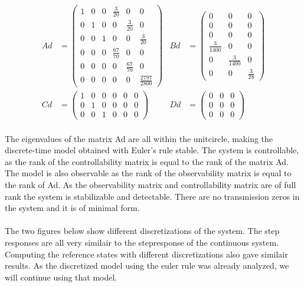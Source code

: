 \documentclass[•]{article}
\begin{document}
\begin{align*}
Ad &= \left(\begin{array}{cccccc} 1 & 0 & 0 & \frac{3}{20} & 0 & 0\\ 0 & 1 & 0 & 0 & \frac{3}{20} & 0\\ 0 & 0 & 1 & 0 & 0 & \frac{3}{20}\\ 0 & 0 & 0 & \frac{67}{70} & 0 & 0\\ 0 & 0 & 0 & 0 & \frac{67}{70} & 0\\ 0 & 0 & 0 & 0 & 0 & \frac{2797}{2800} \end{array}\right) & Bd &= \left(\begin{array}{ccc} 0 & 0 & 0\\ 0 & 0 & 0\\ 0 & 0 & 0\\ \frac{3}{1400} & 0 & 0\\ 0 & \frac{3}{1400} & 0\\ 0 & 0 & \frac{3}{28} \end{array}\right) \\
Cd &= \left(\begin{array}{cccccc} 1 & 0 & 0 & 0 & 0 & 0\\ 0 & 1 & 0 & 0 & 0 & 0\\ 0 & 0 & 1 & 0 & 0 & 0 \end{array}\right) & Dd &=  \left(\begin{array}{ccc} 0 & 0 & 0\\ 0 & 0 & 0\\ 0 & 0 & 0 \end{array}\right) \\ 
\end{align*}

The eigenvalues of the matrix Ad are all within the unitcircle, making the discrete-time model obtained with Euler's rule stable. The system is controllable, as the rank of the controllability matrix is equal to the rank of the matrix Ad. The model is also observable as the rank of the observability matrix is equal to the rank of Ad. As the observability matrix and controllability matrix are of full rank the system is stabilizable and detectable. There are no transmission zeros in the system and it is of minimal form.
\\\\
The two figures below show different discretizations of the system. The step responses are all very similair to the stepresponse of the continuous system. Computing the reference states with different discretizations also gave similair results. As the discretized model using the euler rule was already analyzed, we will continue using that model. 
\end{document}
